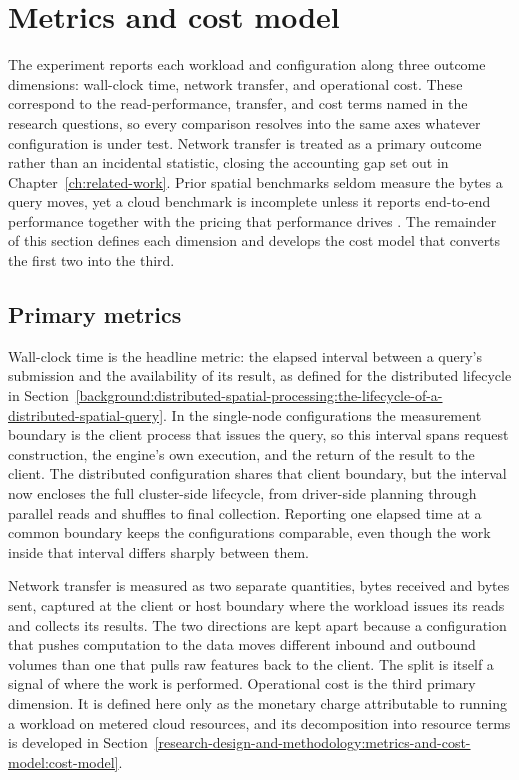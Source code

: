 \section{Metrics and cost model}
\label{research-design-and-methodology:metrics-and-cost-model}

The experiment reports each workload and configuration along three outcome dimensions: wall-clock time, network transfer, and operational cost. These correspond to the read-performance, transfer, and cost terms named in the research questions, so every comparison resolves into the same axes whatever configuration is under test. Network transfer is treated as a primary outcome rather than an incidental statistic, closing the accounting gap set out in Chapter~\ref{ch:related-work}. Prior spatial benchmarks seldom measure the bytes a query moves, yet a cloud benchmark is incomplete unless it reports end-to-end performance together with the pricing that performance drives \parencite{folkerts2012_benchmarking_in_the_cloud}. The remainder of this section defines each dimension and develops the cost model that converts the first two into the third.

\subsection{Primary metrics}
\label{research-design-and-methodology:metrics-and-cost-model:primary-metrics}

Wall-clock time is the headline metric: the elapsed interval between a query's submission and the availability of its result, as defined for the distributed lifecycle in Section~\ref{background:distributed-spatial-processing:the-lifecycle-of-a-distributed-spatial-query}. In the single-node configurations the measurement boundary is the client process that issues the query, so this interval spans request construction, the engine's own execution, and the return of the result to the client. The distributed configuration shares that client boundary, but the interval now encloses the full cluster-side lifecycle, from driver-side planning through parallel reads and shuffles to final collection. Reporting one elapsed time at a common boundary keeps the configurations comparable, even though the work inside that interval differs sharply between them.

Network transfer is measured as two separate quantities, bytes received and bytes sent, captured at the client or host boundary where the workload issues its reads and collects its results. The two directions are kept apart because a configuration that pushes computation to the data moves different inbound and outbound volumes than one that pulls raw features back to the client. The split is itself a signal of where the work is performed. Operational cost is the third primary dimension. It is defined here only as the monetary charge attributable to running a workload on metered cloud resources, and its decomposition into resource terms is developed in Section~\ref{research-design-and-methodology:metrics-and-cost-model:cost-model}.

